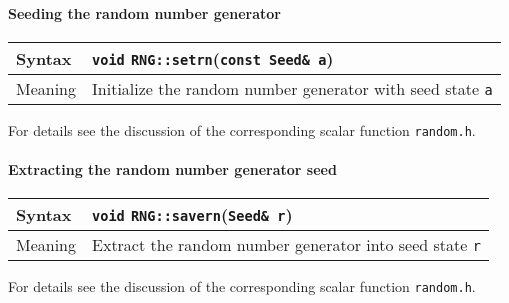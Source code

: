 \documentclass[12pt,letterpaper]{article}
\newcommand{\tRandomState}{Seed}
\begin{document}
\paragraph{Seeding the random number generator}

\begin{flushleft}
  \begin{tabular}{|l|l|}
  \hline
  Syntax      & {\tt void} \verb|RNG::setrn|({\tt const \tRandomState\& a}) \\
  \hline
  Meaning     & Initialize the random number generator with seed state \verb|a|\\
  \hline
  \end{tabular}
\end{flushleft}

For details see the discussion of the corresponding scalar function
{\tt random.h}.

\paragraph{Extracting the random number generator seed}

\begin{flushleft}
  \begin{tabular}{|l|l|}
  \hline
  Syntax      & {\tt void} \verb|RNG::savern|({\tt \tRandomState\& r}) \\
  \hline
  Meaning     & Extract the random number generator into seed state \verb|r|\\
  \hline
  \end{tabular}
\end{flushleft}

For details see the discussion of the corresponding scalar function
{\tt random.h}.
\end{document}
